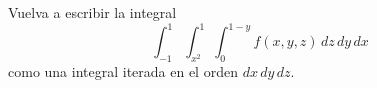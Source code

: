 \item Vuelva a escribir la integral
\[ \int_{-1}^1 \int_{x^2}^1 \int_0^{1-y} f(x, y, z) \, dz \, dy \, dx \]
como una integral iterada en el orden $dx \, dy \, dz$.
